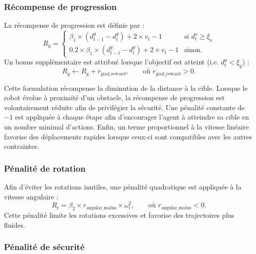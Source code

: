 
\subsubsection{Récompense de progression}

\noindent La récompense de progression est définie par :
$$
    R_\text{g} = \begin{cases}
        \beta_1 \times (d^g_{t-1} - d^g_t) + 2 \times v_t - 1            & \text{si } d^o_t \ge\xi_{\text{s}} \\
        0.2 \times \beta_1 \times (d^g_{t-1} - d^g_t) + 2 \times v_t - 1 & \text{sinon.}
    \end{cases}
$$
Un bonus supplémentaire est attribué lorsque l'objectif est atteint (i.e. $d^g_t < \xi_{\text{g}}$) :
$$
    R_{\text{g}} \leftarrow R_{\text{g}} + r_{\text{goal\_reward}},
    \qquad \text{où }
    r_{\text{goal\_reward}} > 0.
$$

\noindent Cette formulation récompense la diminution de la distance à la cible. Lorsque le robot évolue à proximité d'un obstacle, la récompense de progression est volontairement réduite afin de privilégier la sécurité. Une pénalité constante de $-1$ est appliquée à chaque étape afin d'encourager l'agent à atteindre sa cible en un nombre minimal d'actions. Enfin, un terme proportionnel à la vitesse linéaire favorise des déplacements rapides lorsque ceux-ci sont compatibles avec les autres contraintes.


\subsubsection{Pénalité de rotation}

\noindent Afin d'éviter les rotations inutiles, une pénalité quadratique est appliquée à la vitesse angulaire :
$$
    R_\text{r} = \beta_2 \times r_{\text{angular\_malus}} \times \omega_t^2,
    \qquad \text{où }
    r_{\text{angular\_malus}} < 0.
$$
\noindent Cette pénalité limite les rotations excessives et favorise des trajectoires plus fluides.


\subsubsection{Pénalité de sécurité}


